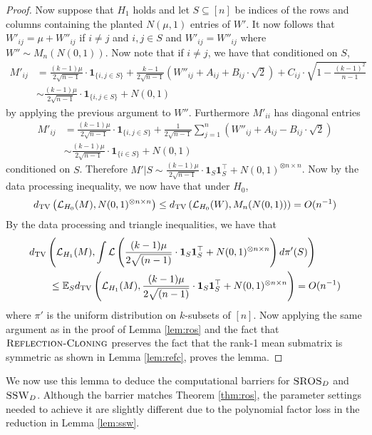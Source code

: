 \begin{proof}
Now suppose that $H_1$ holds and let $S \subseteq [n]$ be indices of the rows and columns containing the planted $N(\mu, 1)$ entries of $W'$. It now follows that $W'_{ij} = \mu + W''_{ij}$ if $i \neq j$ and $i, j \in S$ and $W'_{ij} = W''_{ij}$ where $W'' \sim M_n(N(0, 1))$. Now note that if $i \neq j$, we have that conditioned on $S$,
\begin{align*}
M'_{ij} &= \frac{(k-1)\mu}{2 \sqrt{n - 1}} \cdot \mathbf{1}_{\{i, j \in S\}}+ \frac{k-1}{2 \sqrt{n - 1}} \left( W''_{ij} + A_{ij} + B_{ij} \cdot \sqrt{2} \right) + C_{ij} \cdot \sqrt{1 - \frac{(k-1)^2}{n - 1}} \\
&\sim \frac{(k-1)\mu}{2 \sqrt{n - 1}} \cdot \mathbf{1}_{\{i, j \in S\}} + N(0, 1)
\end{align*}
by applying the previous argument to $W''$. Furthermore $M'_{ii}$ has diagonal entries
\begin{align*}
M'_{ij} &= \frac{(k-1)\mu}{2 \sqrt{n - 1}} \cdot \mathbf{1}_{\{i, j \in S\}}+ \frac{1}{2\sqrt{n - 1}} \sum_{j = 1}^n \left( W''_{ij} + A_{ij} - B_{ij} \cdot \sqrt{2} \right) \\
&\sim \frac{(k-1)\mu}{2 \sqrt{n - 1}} \cdot \mathbf{1}_{\{i \in S\}} + N(0, 1)
\end{align*}
conditioned on $S$. Therefore $M' | S\sim \frac{(k-1)\mu}{2\sqrt{n - 1}} \cdot \mathbf{1}_S \mathbf{1}_S^\top + N(0, 1)^{\otimes n \times n}$. Now by the data processing inequality, we now have that under $H_0$,
$$d_{\text{TV}}\left( \mathcal{L}_{H_0}(M), N(0, 1)^{\otimes n \times n} \right) \le d_{\text{TV}}\left( \mathcal{L}_{H_0}(W), M_n(N(0, 1)) \right) = O(n^{-1})$$
By the data processing and triangle inequalities, we have that
\begin{align*}
&d_{\text{TV}}\left( \mathcal{L}_{H_1}(M), \int \mathcal{L}\left( \frac{(k-1)\mu}{2\sqrt{(n-1)}} \cdot  \mathbf{1}_S \mathbf{1}_S^\top + N(0, 1)^{\otimes n \times n} \right) d\pi'(S) \right) \\
&\quad \quad \le \mathbb{E}_S d_{\text{TV}}\left( \mathcal{L}_{H_1}(M), \frac{(k-1)\mu}{2\sqrt{(n-1)}} \cdot  \mathbf{1}_S \mathbf{1}_S^\top + N(0, 1)^{\otimes n \times n} \right) = O(n^{-1})
\end{align*}
where $\pi'$ is the uniform distribution on $k$-subsets of $[n]$. Now applying the same argument as in the proof of Lemma \ref{lem:ros} and the fact that $\textsc{Reflection-Cloning}$ preserves the fact that the rank-1 mean submatrix is symmetric as shown in Lemma \ref{lem:refc}, proves the lemma.
\end{proof}

We now use this lemma to deduce the computational barriers for $\textsc{SROS}_D$ and $\textsc{SSW}_D$. Although the barrier matches Theorem \ref{thm:ros}, the parameter settings needed to achieve it are slightly different due to the polynomial factor loss in the reduction in Lemma \ref{lem:ssw}.

